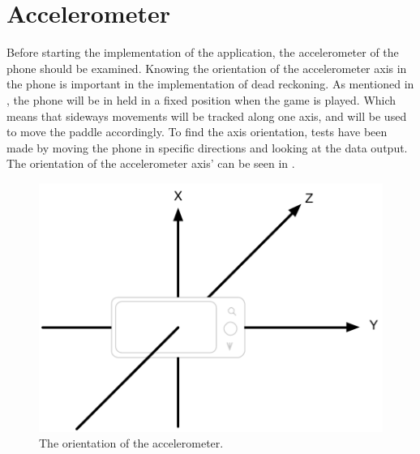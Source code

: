 \section{Accelerometer}\label{section:accelerometer}
Before starting the implementation of the application, the accelerometer of the phone should be examined. 
Knowing the orientation of the accelerometer axis in the phone is important in the implementation of dead reckoning.
As mentioned in , the phone will be in held in a fixed position when the game is played. 
Which means that sideways movements will be tracked along one axis, and will be used to move the paddle accordingly.
To find the axis orientation, tests have been made by moving the phone in specific directions and looking at the data output. 
The orientation of the accelerometer axis' can be seen in .

\begin{figure}[h]
	\centering
	\includegraphics[scale=0.5]{media/phone-rotation/phone-axistocality}
	\caption{The orientation of the accelerometer.}
	\label{figure:axis-orientation}
\end{figure}

